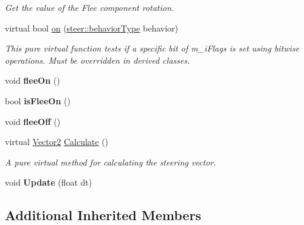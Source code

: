 \begin{DoxyCompactItemize}
\begin{DoxyCompactList}\small\item\em Get the value of the Flee component rotation. \end{DoxyCompactList}\item 
virtual bool \hyperlink{classsteer_1_1_flee_component_a7e344d7ea6b5b2f3e50ef7f21ec1ab10}{on} (\hyperlink{namespacesteer_afe6e72f8f8088962727051501181acbe}{steer\-::behavior\-Type} behavior)
\begin{DoxyCompactList}\small\item\em This pure virtual function tests if a specific bit of m\-\_\-i\-Flags is set using bitwise operations. Must be overridden in derived classes. \end{DoxyCompactList}\item 
\hypertarget{classsteer_1_1_flee_component_a9dcd08c721082c34c3ab64b15b52cbf7}{void {\bfseries flee\-On} ()}\label{classsteer_1_1_flee_component_a9dcd08c721082c34c3ab64b15b52cbf7}

\item 
\hypertarget{classsteer_1_1_flee_component_a6eb91968d02482207fe55da84d1c1e10}{bool {\bfseries is\-Flee\-On} ()}\label{classsteer_1_1_flee_component_a6eb91968d02482207fe55da84d1c1e10}

\item 
\hypertarget{classsteer_1_1_flee_component_a2b776b76125b6ab3212331527fd65ad9}{void {\bfseries flee\-Off} ()}\label{classsteer_1_1_flee_component_a2b776b76125b6ab3212331527fd65ad9}

\item 
\hypertarget{classsteer_1_1_flee_component_a59bc470e39187f1d8c8ee7c790139ff0}{virtual \hyperlink{structsteer_1_1_vector2}{Vector2} \hyperlink{classsteer_1_1_flee_component_a59bc470e39187f1d8c8ee7c790139ff0}{Calculate} ()}\label{classsteer_1_1_flee_component_a59bc470e39187f1d8c8ee7c790139ff0}

\begin{DoxyCompactList}\small\item\em A pure virtual method for calculating the steering vector. \end{DoxyCompactList}\item 
\hypertarget{classsteer_1_1_flee_component_ab7bde45febdd507ef92c0e1993c5d68c}{void {\bfseries Update} (float dt)}\label{classsteer_1_1_flee_component_ab7bde45febdd507ef92c0e1993c5d68c}

\end{DoxyCompactItemize}
\subsection*{Additional Inherited Members}


